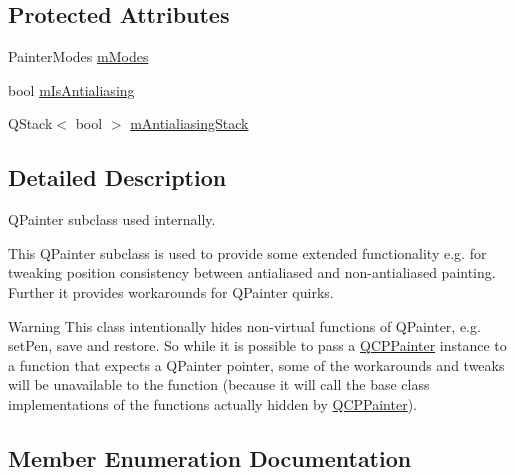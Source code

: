 \subsection*{Protected Attributes}
\begin{DoxyCompactItemize}
\item 
Painter\+Modes \hyperlink{class_q_c_p_painter_af5d1d6e5df0adbc7de5633250fb3396c}{m\+Modes}
\item 
bool \hyperlink{class_q_c_p_painter_a7055085da176aee0f6b23298f1003d08}{m\+Is\+Antialiasing}
\item 
Q\+Stack$<$ bool $>$ \hyperlink{class_q_c_p_painter_a0189e641bbf7dc31ac15aef7b36501fa}{m\+Antialiasing\+Stack}
\end{DoxyCompactItemize}


\subsection{Detailed Description}
Q\+Painter subclass used internally. 

This Q\+Painter subclass is used to provide some extended functionality e.\+g. for tweaking position consistency between antialiased and non-\/antialiased painting. Further it provides workarounds for Q\+Painter quirks.

\begin{DoxyWarning}{Warning}
This class intentionally hides non-\/virtual functions of Q\+Painter, e.\+g. set\+Pen, save and restore. So while it is possible to pass a \hyperlink{class_q_c_p_painter}{Q\+C\+P\+Painter} instance to a function that expects a Q\+Painter pointer, some of the workarounds and tweaks will be unavailable to the function (because it will call the base class implementations of the functions actually hidden by \hyperlink{class_q_c_p_painter}{Q\+C\+P\+Painter}). 
\end{DoxyWarning}


\subsection{Member Enumeration Documentation}
\hypertarget{class_q_c_p_painter_a156cf16444ff5e0d81a73c615fdb156d}{}
